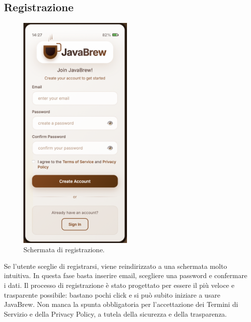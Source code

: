 \subsection{Registrazione}
\begin{figure}[H]
    \centering
    \includegraphics[width=0.5\textwidth]{./assets/Create_acoount.png}
    \caption{Schermata di registrazione.}
\end{figure}
Se l’utente sceglie di registrarsi, viene reindirizzato a una schermata molto intuitiva. In questa fase basta inserire email, scegliere una password e confermare i dati. Il processo di registrazione è stato progettato per essere il più veloce e trasparente possibile: bastano pochi click e si può subito iniziare a usare JavaBrew. Non manca la spunta obbligatoria per l’accettazione dei Termini di Servizio e della Privacy Policy, a tutela della sicurezza e della trasparenza.

